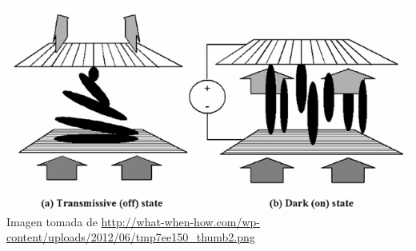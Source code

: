 \documentclass[serif,8pt]{beamer}
\begin{document}
\begin{frame}
\begin{columns}
		\end{columns}
		\begin{center}
		\includegraphics[scale=0.20]{img/tnlcd.png}\\
		\tiny Imagen tomada de \url{http://what-when-how.com/wp-content/uploads/2012/06/tmp7ee150_thumb2.png}		
		\end{center}	
		\end{frame}	


		
\end{document}
